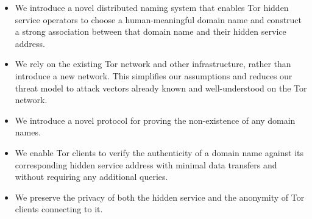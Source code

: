 \begin{itemize}
	\item We introduce a novel distributed naming system that enables Tor hidden service operators to choose a human-meaningful domain name and construct a strong association between that domain name and their hidden service address.
	\item We rely on the existing Tor network and other infrastructure, rather than introduce a new network. This simplifies our assumptions and reduces our threat model to attack vectors already known and well-understood on the Tor network.
	\item We introduce a novel protocol for proving the non-existence of any domain names.
	\item We enable Tor clients to verify the authenticity of a domain name against its corresponding hidden service address with minimal data transfers and without requiring any additional queries.
	\item We preserve the privacy of both the hidden service and the anonymity of Tor clients connecting to it.
\end{itemize}
